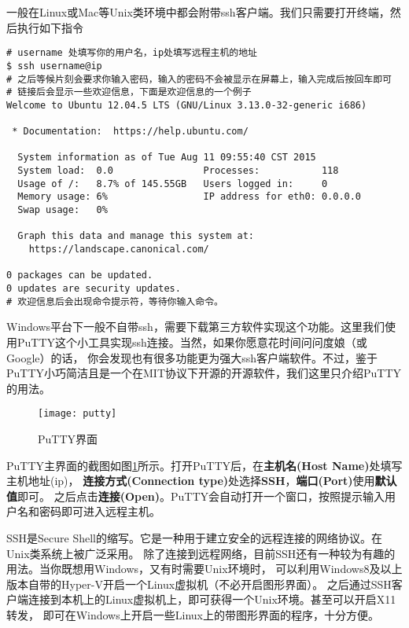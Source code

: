 一般在Linux或Mac等Unix类环境中都会附带ssh客户端。我们只需要打开终端，然后执行如下指令

\begin{verbatim}
# username 处填写你的用户名，ip处填写远程主机的地址
$ ssh username@ip
# 之后等候片刻会要求你输入密码，输入的密码不会被显示在屏幕上，输入完成后按回车即可
# 链接后会显示一些欢迎信息，下面是欢迎信息的一个例子
Welcome to Ubuntu 12.04.5 LTS (GNU/Linux 3.13.0-32-generic i686)

 * Documentation:  https://help.ubuntu.com/

  System information as of Tue Aug 11 09:55:40 CST 2015
  System load:  0.0                Processes:           118
  Usage of /:   8.7% of 145.55GB   Users logged in:     0
  Memory usage: 6%                 IP address for eth0: 0.0.0.0
  Swap usage:   0%

  Graph this data and manage this system at:
    https://landscape.canonical.com/

0 packages can be updated.
0 updates are security updates.
# 欢迎信息后会出现命令提示符，等待你输入命令。
\end{verbatim}

Windows平台下一般不自带ssh，需要下载第三方软件实现这个功能。这里我们使用PuTTY这个小工具实现ssh连接。当然，如果你愿意花时间问问度娘（或Google）的话，
你会发现也有很多功能更为强大ssh客户端软件。不过，鉴于PuTTY小巧简洁且是一个在MIT协议下开源的开源软件，我们这里只介绍PuTTY的用法。

\begin{figure}[htbp]
  \centering
  \texttt{[image: putty]}
  \caption{PuTTY界面}\label{fig:putty} 
\end{figure}

PuTTY主界面的截图如图\ref{fig:putty}所示。打开PuTTY后，在\textbf{主机名(Host Name)}处填写主机地址(ip)，
\textbf{连接方式(Connection type)}处选择\textbf{SSH}，\textbf{端口(Port)}使用\textbf{默认值}即可。
之后点击\textbf{连接(Open)}。PuTTY会自动打开一个窗口，按照提示输入用户名和密码即可进入远程主机。

\begin{note}
SSH是Secure Shell的缩写。它是一种用于建立安全的远程连接的网络协议。在Unix类系统上被广泛采用。
除了连接到远程网络，目前SSH还有一种较为有趣的用法。当你既想用Windows，又有时需要Unix环境时，
可以利用Windows8及以上版本自带的Hyper-V开启一个Linux虚拟机（不必开启图形界面）。
之后通过SSH客户端连接到本机上的Linux虚拟机上，即可获得一个Unix环境。甚至可以开启X11转发，
即可在Windows上开启一些Linux上的带图形界面的程序，十分方便。
\end{note}

